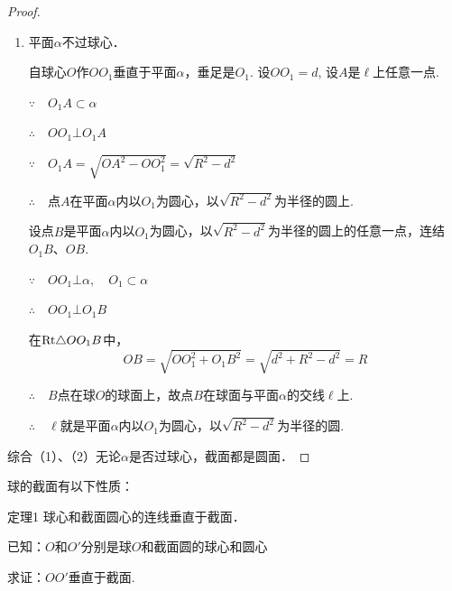 \begin{proof}
\begin{enumerate}[(1)]
\begin{minipage}{.47\textwidth}
\end{minipage}

\item 平面$\alpha$不过球心．

自球心$O$作$OO_1$垂直于平面$\alpha$，垂足是$O_1$. 设$OO_1=d$, 设$A$是$\ell$上任意一点. 

$\because\quad O_1A\subset \alpha$

$\therefore\quad OO_1\bot O_1A$

$\because\quad O_1A=\sqrt{OA^2-OO_1^2}=\sqrt{R^2-d^2}$

$\therefore\quad $点$A$在平面$\alpha$内以$O_1$为圆心，以$\sqrt{R^2-d^2}$为半径的圆上.

设点$B$是平面$\alpha$内以$O_1$为圆心，以$\sqrt{R^2-d^2}$为半径的圆上的任意一点，连结$O_1B$、$OB$.

$\because\quad OO_1\bot \alpha, \quad O_1\subset\alpha$

$\therefore\quad OO_1\bot O_1B$

在${\rm Rt}\triangle OO_1B$中，$$OB=\sqrt{OO_1^2+O_1B^2}=\sqrt{d^2+R^2-d^2}=R$$

$\therefore\quad B$点在球$O$的球面上，故点$B$在球面与平面$\alpha$的交线$\ell$上.

$\therefore\quad \ell$就是平面$\alpha$内以$O_1$为圆心，以$\sqrt{R^2-d^2}$为半径的圆.
\end{enumerate}
综合（1）、（2）无论$\alpha$是否过球心，截面都是圆面．
\end{proof}
 
球的截面有以下性质：
\begin{thm}
    {定理1} 球心和截面圆心的连线垂直于截面．
\end{thm}

已知：$O$和$O'$分别是球$O$和截面圆的球心和圆心

求证：$OO'$垂直于截面.

